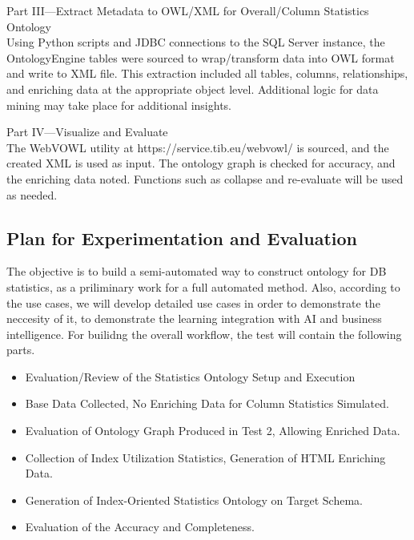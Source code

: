 \documentclass[sigconf]{acmart}
\begin{document}
Part III—Extract Metadata to OWL/XML for Overall/Column Statistics Ontology\\
Using Python scripts and JDBC connections to the SQL Server instance, the OntologyEngine tables were sourced to wrap/transform data into OWL format and write to XML file. This extraction included all tables, columns, relationships, and enriching data at the appropriate object level. Additional logic for data mining may take place for additional insights.

Part IV—Visualize and Evaluate\\
The WebVOWL utility at https://service.tib.eu/webvowl/ is sourced, and the created XML is used as input. The ontology graph is checked for accuracy, and the enriching data noted. Functions such as collapse and re-evaluate will be used as needed.

\subsection{Plan for Experimentation and Evaluation}
The objective is to build a semi-automated way to construct ontology for DB statistics, as a priliminary work for a full automated method. Also, according to the use cases, we will develop detailed use cases in order to demonstrate the neccesity of it, to demonstrate the learning integration with AI and business intelligence. For builidng the overall workflow, the test will contain the following parts.

\begin{itemize}
\item Evaluation/Review of the Statistics Ontology Setup and Execution
\item Base Data Collected, No Enriching Data for Column Statistics Simulated.
\item Evaluation of Ontology Graph Produced in Test 2, Allowing Enriched Data.
\item Collection of Index Utilization Statistics, Generation of HTML Enriching Data.
\item Generation of Index-Oriented Statistics Ontology on Target Schema.
\item Evaluation of the Accuracy and Completeness.
\end{itemize}
\end{document}

